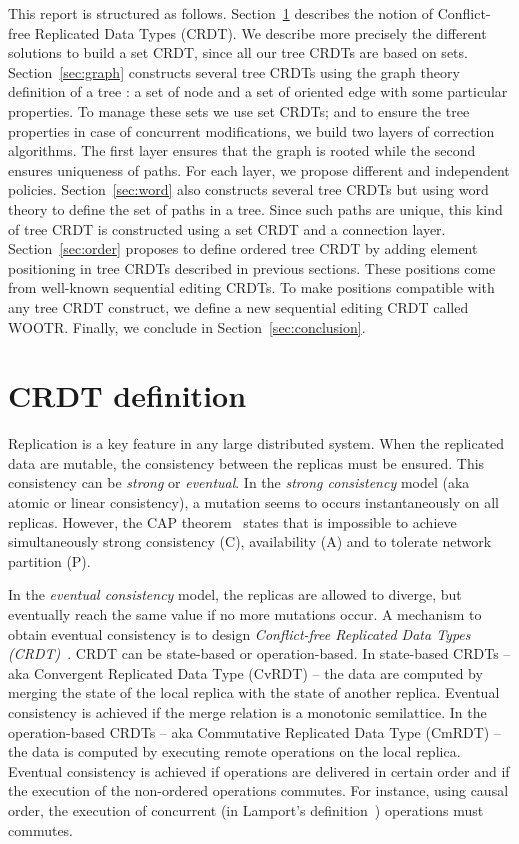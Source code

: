 \documentclass[a4paper]{article}
\begin{document}
  
  \makeRR

This report is structured as follows. Section~\ref{sec:set} describes
the notion of Conflict-free Replicated Data Types (CRDT). We describe
more precisely the different solutions to build a set CRDT, since all
our tree CRDTs are based on sets. Section~\ref{sec:graph} constructs
several tree CRDTs using the graph theory definition of a tree : a set
of node and a set of oriented edge with some particular properties. To
manage these sets we use set CRDTs; and to ensure the tree properties
in case of concurrent modifications, we build two layers of correction
algorithms. The first layer ensures that the graph is rooted while the
second ensures uniqueness of paths. For each layer, we propose
different and independent policies. Section~\ref{sec:word} also
constructs several tree CRDTs but using word theory to define the set
of paths in a tree. Since such paths are unique, this kind of tree
CRDT is constructed using a set CRDT and a connection layer.
Section~\ref{sec:order} proposes to define ordered tree CRDT by adding
element positioning in tree CRDTs described in previous
sections. These positions come from well-known sequential editing
CRDTs. To make positions compatible with any tree CRDT construct, we
define a new sequential editing CRDT called WOOTR. Finally, we
conclude in Section~\ref{sec:conclusion}.

\section{CRDT  definition}
\label{sec:set}

Replication is a key feature in any large distributed system. When the
replicated data are mutable, the consistency between the replicas must
be ensured. This consistency can be {\em strong} or {\em eventual}. In
the {\em strong consistency} model (aka atomic or linear consistency),
a mutation seems to occurs instantaneously on all replicas. However,
the CAP theorem~\cite{gilbert02brewer} states that is impossible to
achieve simultaneously strong consistency (C), availability (A) and to
tolerate network partition (P).

In the {\em eventual consistency} model, the replicas are allowed to
diverge, but eventually reach the same value if no more mutations
occur. A mechanism to obtain eventual consistency is to design {\em
  Conflict-free Replicated Data Types
  (CRDT)}~\cite{shapiro11conflictfree}.  CRDT can be state-based or
operation-based. In state-based CRDTs -- aka Convergent Replicated
Data Type (CvRDT) -- the data are computed by merging the state of the
local replica with the state of another replica. Eventual consistency
is achieved if the merge relation is a monotonic semilattice. In the
operation-based CRDTs -- aka Commutative Replicated Data Type (CmRDT)
-- the data is computed by executing remote operations on the local
replica. Eventual consistency is achieved if operations are delivered
in certain order and if the execution of the non-ordered operations
commutes. For instance, using causal order, the execution of
concurrent (in Lamport's definition~\cite{lamport78time}) operations
must commutes.
\end{document}
